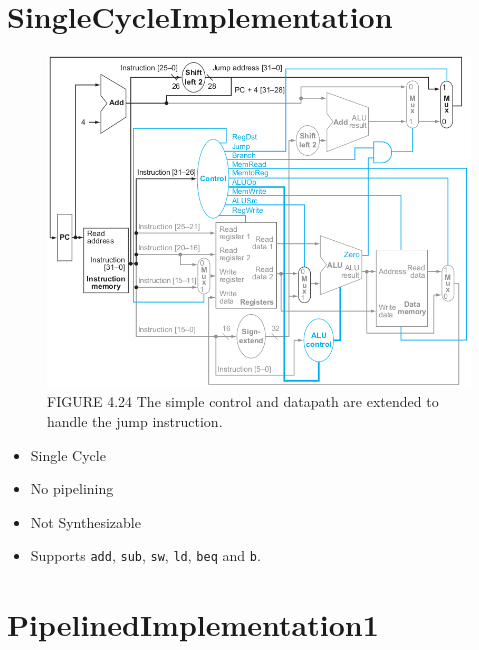 \documentclass{article}
\begin{document}
\section*{SingleCycleImplementation}
\begin{figure}[H]
    \begin{center}
        \includegraphics[scale=0.5]{SingleCycleImplementation/SingleCycle.png}
        \caption*{FIGURE 4.24 The simple control and datapath are extended to handle the jump instruction.}
    \end{center}
\end{figure}


\begin{itemize}
    \item Single Cycle
    \item No pipelining
    \item Not Synthesizable
    \item Supports \verb|add|, \verb|sub|, \verb|sw|, \verb|ld|, \verb|beq| and \verb|b|.
\end{itemize}


\section*{PipelinedImplementation1}
\end{document}
